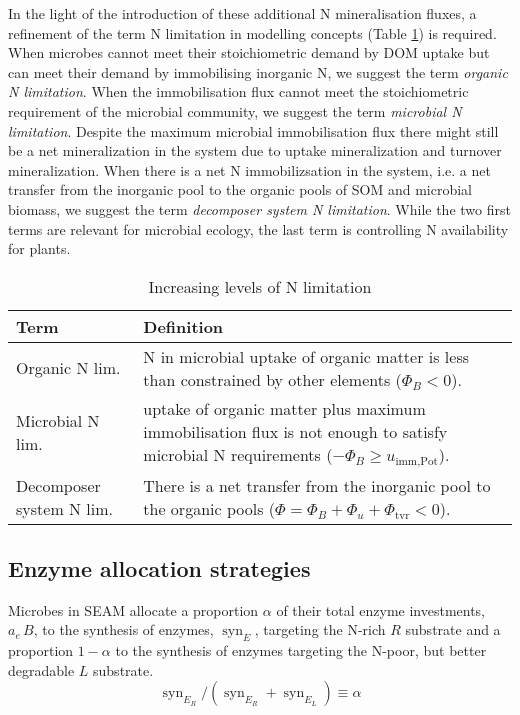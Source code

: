 In the light of the introduction of these additional N mineralisation fluxes, a
refinement of the term N limitation in modelling concepts (Table
\ref{tab:NutrientLimDefs}) is required.
When microbes cannot meet their stoichiometric demand by DOM uptake but can
meet their demand by immobilising inorganic N, we suggest the term 
\textit{organic N limitation}.
When the immobilisation flux cannot meet the stoichiometric requirement of the
microbial community, we suggest the term \textit{microbial N limitation}.
Despite the maximum microbial immobilisation flux there might still be a net
mineralization in the system due to uptake mineralization and turnover
mineralization. When there is a net N
immobilizsation in the system, i.e. a net transfer from the inorganic pool to
the organic pools of SOM and microbial biomass, we suggest the term 
\textit{decomposer system N limitation}. While the two first terms are relevant
for microbial ecology, the last term is controlling N availability for plants.

\begin{table}[t]
\caption{Increasing levels of N limitation \label{tab:NutrientLimDefs}}
\centering
\begin{tabular}{p{2.3cm}p{5.5cm}}
\hline
Term &  Definition \\
\hline
Organic N lim. & N in microbial uptake of organic matter is less than 
constrained by other elements (${\Phi_B < 0}$).
\\
Microbial N lim. & uptake of organic matter plus maximum immobilisation flux is
not enough to satisfy microbial N requirements (${-\Phi_B \ge
u_{\operatorname{imm,Pot}}}$).
\\
Decomposer system N lim. & There is a net transfer from the inorganic pool to
the organic pools (${\Phi = \Phi_B+\Phi_u+\Phi_{\operatorname{tvr}}<0}$).
\\
\hline
\end{tabular}
\end{table}
 
\subsection{ Enzyme allocation strategies} 
\label{sec:AllocStrategies}

Microbes in SEAM allocate a proportion $\alpha$ of their total enzyme
investments, $a_e\,B$, to the synthesis of enzymes, $\operatorname{syn}_{E}$, targeting the
N-rich $R$ substrate and a proportion $1 - \alpha$ to the synthesis of enzymes
targeting the N-poor, but better degradable $L$ substrate.
\begin{equation} 
\label{eq:alpha}
\operatorname{syn}_{E_R} /
(\operatorname{syn}_{E_R} + \operatorname{syn}_{E_L}) \equiv \alpha
\end{equation}

